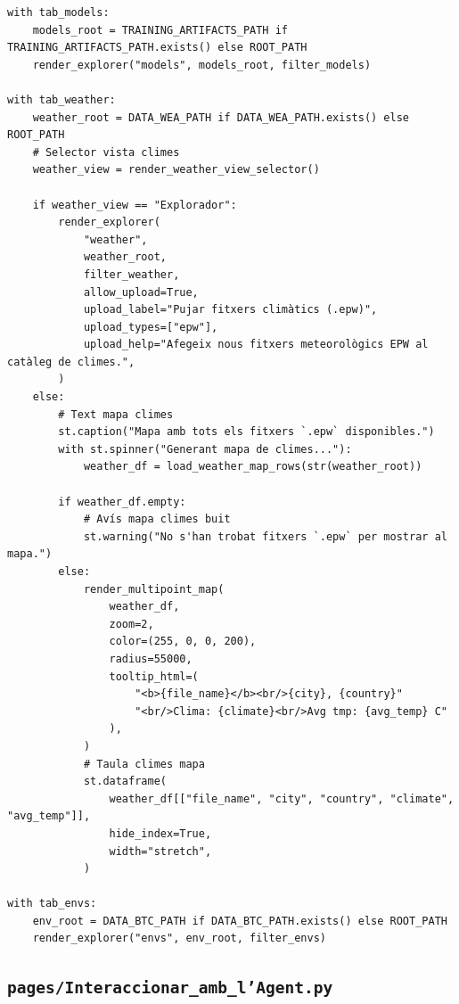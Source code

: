 \documentclass[10pt,a4paper]{article}
\begin{document}
\begin{lstlisting}[style=studioPython,caption={pages/Gestionar\_Arxius.py},label={lst:pages-gestionar-arxius-py}]
with tab_models:
    models_root = TRAINING_ARTIFACTS_PATH if TRAINING_ARTIFACTS_PATH.exists() else ROOT_PATH
    render_explorer("models", models_root, filter_models)

with tab_weather:
    weather_root = DATA_WEA_PATH if DATA_WEA_PATH.exists() else ROOT_PATH
    # Selector vista climes
    weather_view = render_weather_view_selector()

    if weather_view == "Explorador":
        render_explorer(
            "weather",
            weather_root,
            filter_weather,
            allow_upload=True,
            upload_label="Pujar fitxers climàtics (.epw)",
            upload_types=["epw"],
            upload_help="Afegeix nous fitxers meteorològics EPW al catàleg de climes.",
        )
    else:
        # Text mapa climes
        st.caption("Mapa amb tots els fitxers `.epw` disponibles.")
        with st.spinner("Generant mapa de climes..."):
            weather_df = load_weather_map_rows(str(weather_root))

        if weather_df.empty:
            # Avís mapa climes buit
            st.warning("No s'han trobat fitxers `.epw` per mostrar al mapa.")
        else:
            render_multipoint_map(
                weather_df,
                zoom=2,
                color=(255, 0, 0, 200),
                radius=55000,
                tooltip_html=(
                    "<b>{file_name}</b><br/>{city}, {country}"
                    "<br/>Clima: {climate}<br/>Avg tmp: {avg_temp} C"
                ),
            )
            # Taula climes mapa
            st.dataframe(
                weather_df[["file_name", "city", "country", "climate", "avg_temp"]],
                hide_index=True,
                width="stretch",
            )

with tab_envs:
    env_root = DATA_BTC_PATH if DATA_BTC_PATH.exists() else ROOT_PATH
    render_explorer("envs", env_root, filter_envs)
\end{lstlisting}


\subsection{\texorpdfstring{\texttt{pages/Interaccionar\_amb\_l'Agent.py}}{pages/Interaccionar\_amb\_l'Agent.py}}
\end{document}
